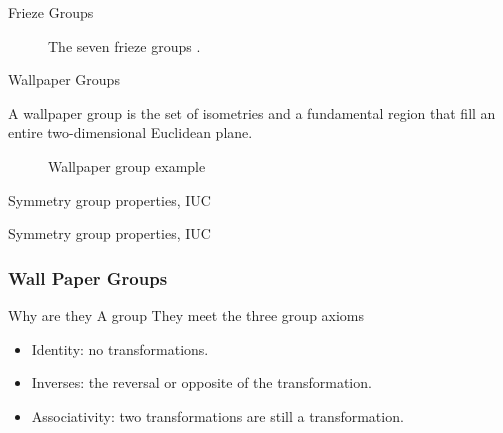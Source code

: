 \documentclass{beamer}
\theoremstyle{definition}
\begin{document}
\begin{frame}{Frieze Groups}
    \begin{figure}
    \centering
	
	\caption{The seven frieze groups \cite{Tomruen:2015}.}
	\label{fig:FriezeGroups}
\end{figure}
\end{frame}

\begin{frame}{Wallpaper Groups}
    \begin{definition}
        A wallpaper group is the set of isometries and a fundamental region that fill an entire two-dimensional Euclidean plane. \cite{Ganapathy:2021}
    \end{definition}
    \begin{figure}
        \centering
        
        \caption{Wallpaper group example}
        \label{fig:enter-label}
    \end{figure}
\end{frame}

\begin{frame}{Symmetry group properties, IUC}
    
\end{frame}
\begin{frame}{Symmetry group properties, IUC}
    
\end{frame}

\begin{frame}
\frametitle{Wall Paper Groups}
    \begin{block}{Why are they A group}
        They meet the three group axioms
        \begin{itemize}
            \item Identity: no transformations.
            \item Inverses: the reversal or opposite of the transformation.
            \item Associativity: two transformations are still a transformation. \cite{Angela:2023}
        \end{itemize}       
    \end{block}
\end{frame}
\end{document}
